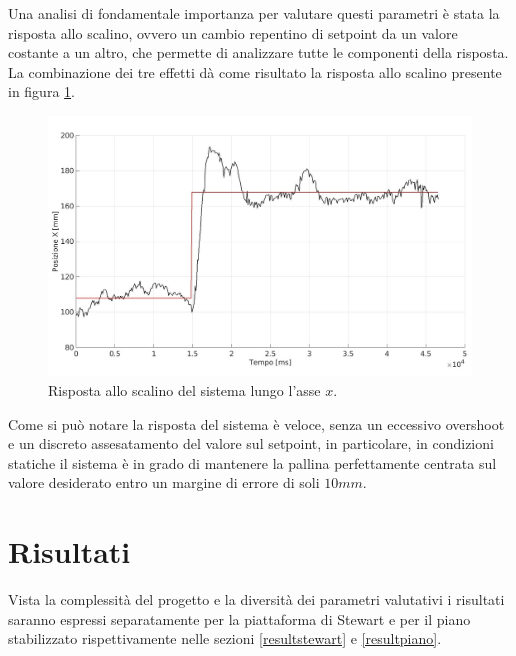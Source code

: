 \documentclass[12pt,twoside,openright]{report}
\begin{document}
Una analisi di fondamentale importanza per valutare questi parametri è stata la risposta allo scalino, ovvero un cambio repentino di setpoint da un valore costante a un altro, che permette di analizzare tutte le componenti della risposta. La combinazione dei tre effetti dà come risultato la risposta allo scalino presente in figura \ref{fig:step}.
\begin{figure}[h!]
\centering

\includegraphics[width=\textwidth]{step2.jpg}

\caption{Risposta allo scalino del sistema lungo l'asse $x$.} \label{fig:step}
\end{figure}
Come si può notare la risposta del sistema è veloce, senza un eccessivo overshoot e un discreto assesatamento del valore sul setpoint, in particolare, in condizioni statiche il sistema è in grado di mantenere la pallina perfettamente centrata sul valore desiderato entro un margine di errore di soli $10mm$.
\chapter{Risultati}\label{risultati}
Vista la complessità del progetto e la diversità dei parametri valutativi i risultati saranno espressi separatamente per la piattaforma di Stewart e per il piano stabilizzato rispettivamente nelle sezioni \ref{resultstewart} e \ref{resultpiano}.
\end{document}
